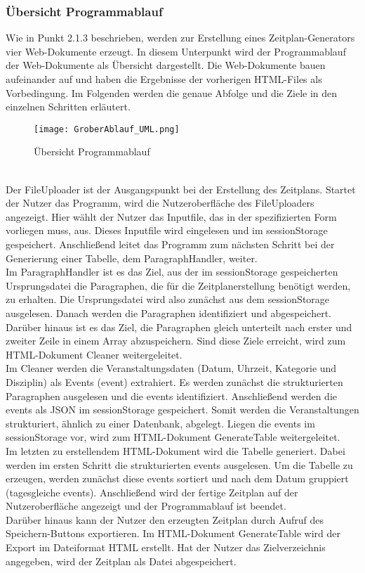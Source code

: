 \subsubsection{Übersicht Programmablauf}
Wie in Punkt 2.1.3 beschrieben, werden zur Erstellung eines Zeitplan-Generators vier Web-Dokumente erzeugt. In diesem Unterpunkt wird der Programmablauf der Web-Dokumente als Übersicht dargestellt.
Die Web-Dokumente bauen aufeinander auf und haben die Ergebnisse der vorherigen HTML-Files als Vorbedingung. Im Folgenden werden die genaue Abfolge und die Ziele in den einzelnen Schritten erläutert.\\
\begin{figure}[htbp]
  \centering
  \texttt{[image: GroberAblauf\_UML.png]}
  \caption{Übersicht Programmablauf}
  \label{fig:Fig1}
\end{figure} \\
Der FileUploader ist der Ausgangspunkt bei der Erstellung des Zeitplans. Startet der Nutzer das Programm, wird die Nutzeroberfläche des FileUploaders angezeigt. Hier wählt der Nutzer das Inputfile, das in der spezifizierten Form vorliegen muss, aus. Dieses Inputfile wird eingelesen und im sessionStorage gespeichert. Anschließend leitet das Programm zum nächsten Schritt bei der Generierung einer Tabelle, dem ParagraphHandler, weiter.\\
Im ParagraphHandler ist es das Ziel, aus der im sessionStorage gespeicherten Ursprungsdatei die Paragraphen, die für die Zeitplanerstellung benötigt werden, zu erhalten. Die Ursprungsdatei wird also zunächst aus dem sessionStorage ausgelesen. Danach werden die Paragraphen identifiziert und abgespeichert. Darüber hinaus ist es das Ziel, die Paragraphen gleich unterteilt nach erster und zweiter Zeile in einem Array abzuspeichern. Sind diese Ziele erreicht, wird zum HTML-Dokument Cleaner weitergeleitet.\\
Im Cleaner werden die Veranstaltungsdaten (Datum, Uhrzeit, Kategorie und Disziplin) als Events (event) extrahiert. Es werden zunächst die strukturierten Paragraphen ausgelesen und die events identifiziert. Anschließend werden die events als JSON im sessionStorage gespeichert. Somit werden die Veranstaltungen strukturiert, ähnlich zu einer Datenbank, abgelegt. Liegen die events im sessionStorage vor, wird zum HTML-Dokument GenerateTable weitergeleitet.\\
Im letzten zu erstellendem HTML-Dokument wird die Tabelle generiert. Dabei werden im ersten Schritt die strukturierten events ausgelesen. Um die Tabelle zu erzeugen, werden zunächst diese events sortiert und nach dem Datum gruppiert (tagesgleiche events). Anschließend wird der fertige Zeitplan auf der Nutzeroberfläche angezeigt und der Programmablauf ist beendet.\\
Darüber hinaus kann der Nutzer den erzeugten Zeitplan durch Aufruf des Speichern-Buttons exportieren. Im HTML-Dokument GenerateTable wird der Export im Dateiformat HTML erstellt. Hat der Nutzer das Zielverzeichnis angegeben, wird der Zeitplan als Datei abgespeichert.
 
